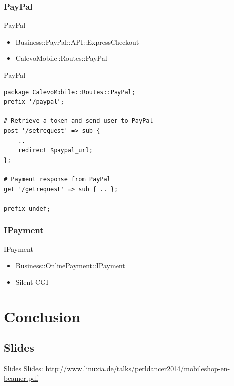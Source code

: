 \subsubsection{PayPal}
\begin{frame}[fragile]{PayPal}
\begin{itemize}
\item Business::PayPal::API::ExpressCheckout
\item CalevoMobile::Routes::PayPal
\end{itemize}
\end{frame}

\begin{frame}[fragile]{PayPal}
\begin{lstlisting}
package CalevoMobile::Routes::PayPal;
prefix '/paypal';

# Retrieve a token and send user to PayPal
post '/setrequest' => sub { 
    .. 
    redirect $paypal_url;
};

# Payment response from PayPal
get '/getrequest' => sub { .. };

prefix undef;
\end{lstlisting}
\end{frame}

\subsubsection{IPayment}
\begin{frame}[fragile]{IPayment}
\begin{itemize}
\item Business::OnlinePayment::IPayment
\item Silent CGI
\end{itemize}
\end{frame}


\section{Conclusion}

\subsection{Slides}

\begin{frame}{Slides}
Slides:
\url{http://www.linuxia.de/talks/perldancer2014/mobileshop-en-beamer.pdf}
\end{frame}




